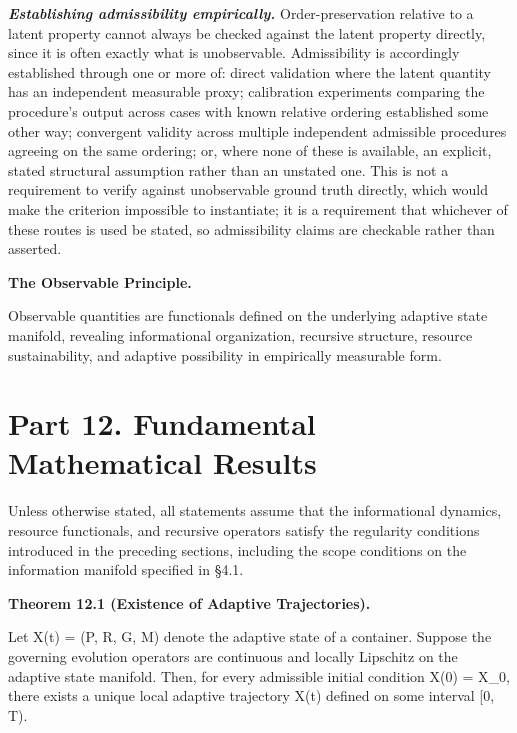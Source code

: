 \documentclass[
]{article}
\begin{document}
\emph{\textbf{Establishing admissibility empirically.}}
Order-preservation relative to a latent property cannot always be
checked against the latent property directly, since it is often exactly
what is unobservable. Admissibility is accordingly established through
one or more of: direct validation where the latent quantity has an
independent measurable proxy; calibration experiments comparing the
procedure's output across cases with known relative ordering established
some other way; convergent validity across multiple independent
admissible procedures agreeing on the same ordering; or, where none of
these is available, an explicit, stated structural assumption rather
than an unstated one. This is not a requirement to verify against
unobservable ground truth directly, which would make the criterion
impossible to instantiate; it is a requirement that whichever of these
routes is used be stated, so admissibility claims are checkable rather
than asserted.

\textbf{The Observable Principle.}

Observable quantities are functionals defined on the underlying adaptive
state manifold, revealing informational organization, recursive
structure, resource sustainability, and adaptive possibility in
empirically measurable form.

\hypertarget{part-12.-fundamental-mathematical-results}{%
\section{Part 12. Fundamental Mathematical
Results}\label{part-12.-fundamental-mathematical-results}}

Unless otherwise stated, all statements assume that the informational
dynamics, resource functionals, and recursive operators satisfy the
regularity conditions introduced in the preceding sections, including
the scope conditions on the information manifold specified in §4.1.

\textbf{Theorem 12.1 (Existence of Adaptive Trajectories).}

Let X(t) = (P, R, G, M) denote the adaptive state of a container.
Suppose the governing evolution operators are continuous and locally
Lipschitz on the adaptive state manifold. Then, for every admissible
initial condition X(0) = X\_0, there exists a unique local adaptive
trajectory X(t) defined on some interval {[}0, T).
\end{document}
